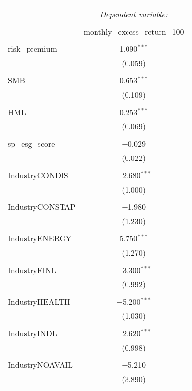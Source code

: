 
\begin{table}[!htbp] \centering 
  \caption{} 
  \label{} 
\begin{tabular}{@{\extracolsep{5pt}}lc} 
\\[-1.8ex]\hline 
\hline \\[-1.8ex] 
 & \multicolumn{1}{c}{\textit{Dependent variable:}} \\ 
\cline{2-2} 
\\[-1.8ex] & monthly\_excess\_return\_100 \\ 
\hline \\[-1.8ex] 
 risk\_premium & 1.090$^{***}$ \\ 
  & (0.059) \\ 
  & \\ 
 SMB & 0.653$^{***}$ \\ 
  & (0.109) \\ 
  & \\ 
 HML & 0.253$^{***}$ \\ 
  & (0.069) \\ 
  & \\ 
 sp\_esg\_score & $-$0.029 \\ 
  & (0.022) \\ 
  & \\ 
 IndustryCONDIS & $-$2.680$^{***}$ \\ 
  & (1.000) \\ 
  & \\ 
 IndustryCONSTAP & $-$1.980 \\ 
  & (1.230) \\ 
  & \\ 
 IndustryENERGY & 5.750$^{***}$ \\ 
  & (1.270) \\ 
  & \\ 
 IndustryFINL & $-$3.300$^{***}$ \\ 
  & (0.992) \\ 
  & \\ 
 IndustryHEALTH & $-$5.200$^{***}$ \\ 
  & (1.030) \\ 
  & \\ 
 IndustryINDL & $-$2.620$^{***}$ \\ 
  & (0.998) \\ 
  & \\ 
 IndustryNOAVAIL & $-$5.210 \\ 
  & (3.890) \\ 

\end{tabular}
\end{table}
